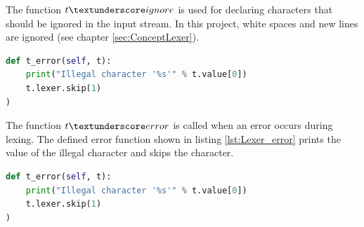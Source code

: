 The function $t\textunderscore ignore$ is used for declaring characters that should be ignored in the input stream.
In this project, white spaces and new lines are ignored (see chapter \ref{sec:ConceptLexer}).

\begin{lstlisting}[language=Python,basicstyle=\scriptsize	,caption= Lexer ignor function,label= lst:Lexer_ignor]
def t_error(self, t):
    print("Illegal character '%s'" % t.value[0])
    t.lexer.skip(1)
)
\end{lstlisting}

The function $t\textunderscore error$ is called when an error occurs during lexing.
The defined error function shown in listing \ref{lst:Lexer_error} prints the value of the illegal character and skips the character. \\

\begin{lstlisting}[language=Python,basicstyle=\scriptsize	,caption= Lexer error function,label= lst:Lexer_error]
def t_error(self, t):
    print("Illegal character '%s'" % t.value[0])
    t.lexer.skip(1)
)
\end{lstlisting}


